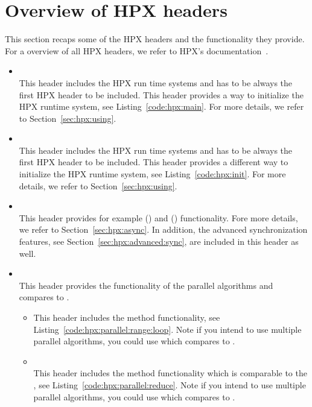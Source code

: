 \section{Overview of HPX headers}
This section recaps some of the HPX headers and the functionality they provide. For a overview of all HPX headers, we refer to HPX's documentation~.
\begin{itemize}
\item {} \\
This header includes the HPX run time systems and has to be always the first HPX header to be included. This header provides a way to initialize the HPX runtime system, see Listing~\ref{code:hpx:main}. For more details, we refer to Section~\ref{sec:hpx:using}. 

\item {} \\
This header includes the HPX run time systems and has to be always the first HPX header to be included. This header provides a different way to initialize the HPX runtime system, see Listing~\ref{code:hpx:init}. For more details, we refer to Section~\ref{sec:hpx:using}.

\item {} \\
This header provides for example  () and  () functionality. Fore more details, we refer to Section~\ref{sec:hpx:async}. In addition, the advanced synchronization features, see Section~\ref{sec:hpx:advanced:sync}, are included in this header as well.

\item {} \\
This header provides the functionality of the parallel algorithms and compares to .
\begin{itemize}
\item {}
This header includes the method  functionality, see Listing~\ref{code:hpx:parallel:range:loop}. Note if you intend to use multiple parallel algorithms, you could use  which compares to .
\item {} \\
This header includes the method  functionality which is comparable to the , see Listing~\ref{code:hpx:parallel:reduce}. Note if you intend to use multiple parallel algorithms, you could use  which compares to . 
\end{itemize}


\end{itemize}
